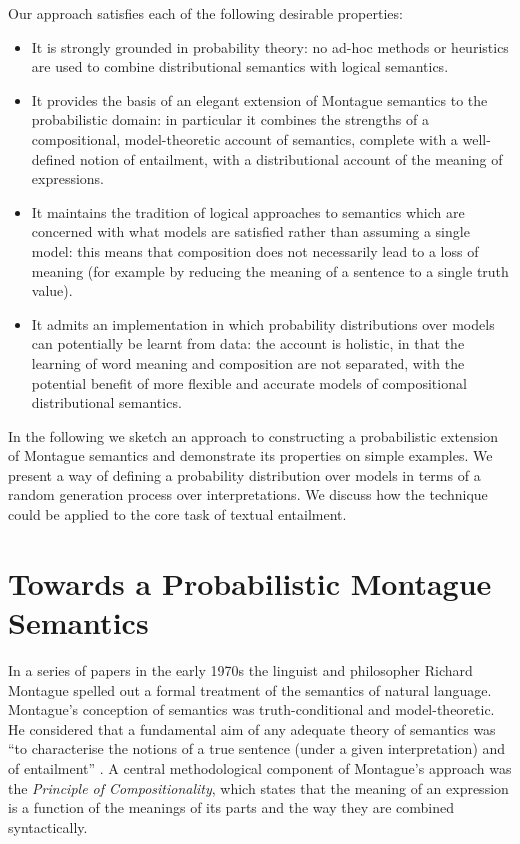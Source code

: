 \documentclass[letterpaper]{article}
\begin{document}
Our approach satisfies each of the following desirable properties:
\begin{itemize}
\item It is strongly grounded in probability theory: no ad-hoc methods
  or heuristics are used to combine distributional semantics with
  logical semantics.
\item It provides the basis of an elegant extension of Montague semantics to the
  probabilistic domain: in particular it combines the strengths of a compositional, model-theoretic account of semantics, complete with a well-defined notion of entailment, with a distributional account of the meaning of expressions.
\item It maintains the tradition of logical approaches to semantics
  which are concerned with what models are satisfied rather than
  assuming a single model: this means that composition does not
  necessarily lead to a loss of meaning (for example by reducing the meaning of a
  sentence to a single truth value).
\item It admits an implementation in which probability distributions
  over models can potentially be learnt from data: the account is
  holistic, in that the learning of word meaning and composition are not
  separated, with the potential benefit of more flexible and accurate
  models of compositional distributional semantics.
\end{itemize}


In the following we sketch an approach to constructing a probabilistic
extension of Montague semantics and demonstrate its properties on
simple examples. We present a way of defining a probability
distribution over models in terms of  a random generation process over
interpretations.  We discuss how the technique could be applied to the
core task of textual entailment.




\section{Towards a Probabilistic Montague Semantics}


In a series of papers in the early 1970s \cite{Montague1970a,Montague1970b,Montague1973} the linguist and philosopher Richard Montague spelled out a formal treatment of the semantics of natural language. Montague's conception of semantics was truth-conditional and model-theoretic. He considered that a fundamental aim of any adequate theory of semantics was ``to characterise the notions of a true sentence (under a given interpretation) and of entailment'' \cite{Montague1970b}. A central methodological component of Montague's approach was the {\em Principle of Compositionality\/}, which states that the meaning of an expression is a function of the meanings of its parts and the way they are combined syntactically.
\end{document}
